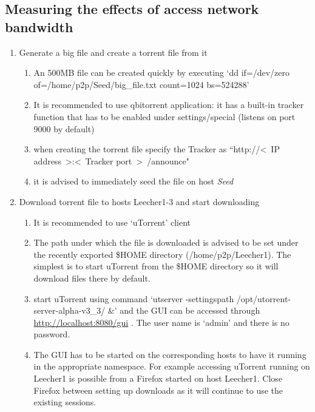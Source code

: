 \documentclass[a4paper]{article}
\begin{document}
\subsection{Measuring the effects of access network bandwidth}
\begin{enumerate}
    \item Generate a big file and create a torrent file from it
          \begin{enumerate}
              \item An 500MB file can be created quickly by executing `dd if=/dev/zero
                    of=/home/p2p/Seed/big\_file.txt count=1024 bs=524288'
              \item It is recommended to use qbitorrent application: it has a built-in tracker function that has to
                    be enabled under settings/special (listens on port 9000 by default)
              \item when creating the torrent file specify the Tracker as ``http://\textless~IP
                    address~\textgreater:\textless~Tracker port~\textgreater~/announce"
              \item it is advised to immediately seed the file on host \emph{Seed}
          \end{enumerate}
    \item  Download torrent file to hosts Leecher1-3 and start downloading
          \begin{enumerate}
              \item It is recommended to use `uTorrent' client
              \item The path under which the file is downloaded is advised to be set under the recently exported
                    \$HOME directory (/home/p2p/Leecher1). The simplest is to start uTorrent from the \$HOME directory
                    so it will download
                    files there by default.
              \item start uTorrent using command `utserver -settingspath /opt/utorrent-server-alpha-v3\_3/ \&' and
                    the GUI can be accessed through \url{http://localhost:8080/gui} . The user name is `admin' and
                    there is no password.
              \item The GUI has to be started on the corresponding hosts to have it running in the appropriate
                    namespace. For example accessing uTorrent running on Leecher1 is possible from a Firefox started on
                    host Leecher1.
                    Close Firefox between setting up downloads as it will continue to use the existing sessions.

\end{enumerate}
\end{enumerate}
\end{document}
